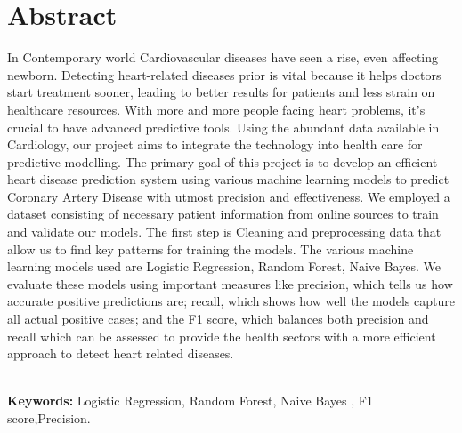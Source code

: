 \chapter*{\center \Large  Abstract}
In Contemporary world Cardiovascular diseases have seen a rise, even affecting newborn. Detecting heart-related diseases prior is vital because it helps doctors start treatment sooner, leading to better results for patients and less strain on healthcare resources. With more and more people facing heart problems, it's crucial to have advanced predictive tools. Using the abundant data available in Cardiology, our project aims to integrate the technology into health care for predictive modelling. The primary goal of this project is to develop an efficient heart disease prediction system using various machine learning models to predict Coronary Artery Disease with utmost precision and effectiveness. We employed a dataset consisting of necessary patient information from online sources to train and validate our models. The first step is Cleaning and preprocessing data that allow us to find key patterns for training the models. The various machine learning models used are Logistic Regression, Random Forest, Naive Bayes. We evaluate these models using important measures like precision, which tells us how accurate positive predictions are; recall, which shows how well the models capture all actual positive cases; and the F1 score, which balances both precision and recall which can be assessed to provide the health sectors with a more efficient approach to detect heart related diseases.



~\\[1cm]
\noindent %
\textbf{Keywords:} Logistic Regression, Random Forest, Naive Bayes , F1 score,Precision.


\vfill
\noindent
